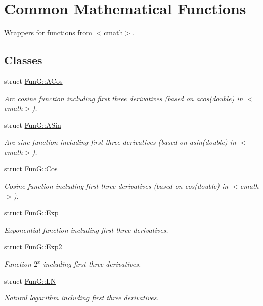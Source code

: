 \hypertarget{group__CMathGroup}{\section{Common Mathematical Functions}
\label{group__CMathGroup}
}


Wrappers for functions from $<$cmath$>$.  


\subsection*{Classes}
\begin{DoxyCompactItemize}
\item 
struct \hyperlink{structFunG_1_1ACos}{Fun\-G\-::\-A\-Cos}
\begin{DoxyCompactList}\small\item\em Arc cosine function including first three derivatives (based on acos(double) in $<$cmath$>$). \end{DoxyCompactList}\item 
struct \hyperlink{structFunG_1_1ASin}{Fun\-G\-::\-A\-Sin}
\begin{DoxyCompactList}\small\item\em Arc sine function including first three derivatives (based on asin(double) in $<$cmath$>$). \end{DoxyCompactList}\item 
struct \hyperlink{structFunG_1_1Cos}{Fun\-G\-::\-Cos}
\begin{DoxyCompactList}\small\item\em Cosine function including first three derivatives (based on cos(double) in $<$cmath$>$). \end{DoxyCompactList}\item 
struct \hyperlink{structFunG_1_1Exp}{Fun\-G\-::\-Exp}
\begin{DoxyCompactList}\small\item\em Exponential function including first three derivatives. \end{DoxyCompactList}\item 
struct \hyperlink{structFunG_1_1Exp2}{Fun\-G\-::\-Exp2}
\begin{DoxyCompactList}\small\item\em Function $2^x$ including first three derivatives. \end{DoxyCompactList}\item 
struct \hyperlink{structFunG_1_1LN}{Fun\-G\-::\-L\-N}
\begin{DoxyCompactList}\small\item\em Natural logarithm including first three derivatives. \end{DoxyCompactList}\item 

\end{DoxyCompactItemize}
